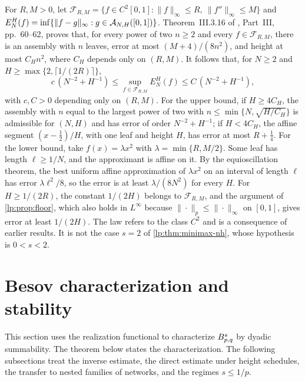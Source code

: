 \documentclass[11pt,a4paper]{article}
\begin{document}
\begin{observacao}
\label{lp:obs:c2-joint}
For $R,M>0$, let $\mathcal F_{R,M}=\{f\in C^2[0,1]:\|f\|_\infty\le R,\ \|f''\|_\infty\le M\}$ and $E^H_N(f)=\inf\{\|f-g\|_\infty:g\in\mathcal A_{N,H}([0,1])\}$. Theorem~III.3.16 of \citet{lp-oliveiravol}, Part~III, pp.~60--62, proves that, for every power of two $n\ge2$ and every $f\in\mathcal F_{R,M}$, there is an assembly with $n$ leaves, error at most $(M+4)/(8n^2)$, and height at most $C_Hn^2$, where $C_H$ depends only on $(R,M)$. It follows that, for $N\ge2$ and $H\ge\max\{2,\lceil1/(2R)\rceil\}$,
\[
 c\,(N^{-2}+H^{-1})\le\sup_{f\in\mathcal F_{R,M}}E^H_N(f)\le C\,(N^{-2}+H^{-1}),
\]
with $c,C>0$ depending only on $(R,M)$. For the upper bound, if $H\ge4C_H$, the assembly with $n$ equal to the largest power of two with $n\le\min\{N,\sqrt{H/C_H}\}$ is admissible for $(N,H)$ and has error of order $N^{-2}+H^{-1}$; if $H<4C_H$, the affine segment $(x-\tfrac12)/H$, with one leaf and height $H$, has error at most $R+\tfrac14$. For the lower bound, take $f(x)=\lambda x^2$ with $\lambda=\min\{R,M/2\}$. Some leaf has length $\ell\ge1/N$, and the approximant is affine on it. By the equioscillation theorem, the best uniform affine approximation of $\lambda x^2$ on an interval of length $\ell$ has error $\lambda\ell^2/8$, so the error is at least $\lambda/(8N^2)$ for every $H$. For $H\ge1/(2R)$, the constant $1/(2H)$ belongs to $\mathcal F_{R,M}$, and the argument of \cref{lp:prop:floor}, which also holds in $L^\infty$ because $\|\cdot\|_p\le\|\cdot\|_\infty$ on $[0,1]$, gives error at least $1/(2H)$. The law refers to the class $C^2$ and is a consequence of earlier results. It is not the case $s=2$ of \cref{lp:thm:minimax-nh}, whose hypothesis is $0<s<2$.
\end{observacao}

\section{Besov characterization and stability}
\label{lp:sec:statements}

This section uses the realization functional to characterize $B^{s}_{p,q}$ by dyadic summability. The theorem below states the characterization. The following subsections treat the inverse estimate, the direct estimate under height schedules, the transfer to nested families of networks, and the regimes $s\le1/p$.
\end{document}
